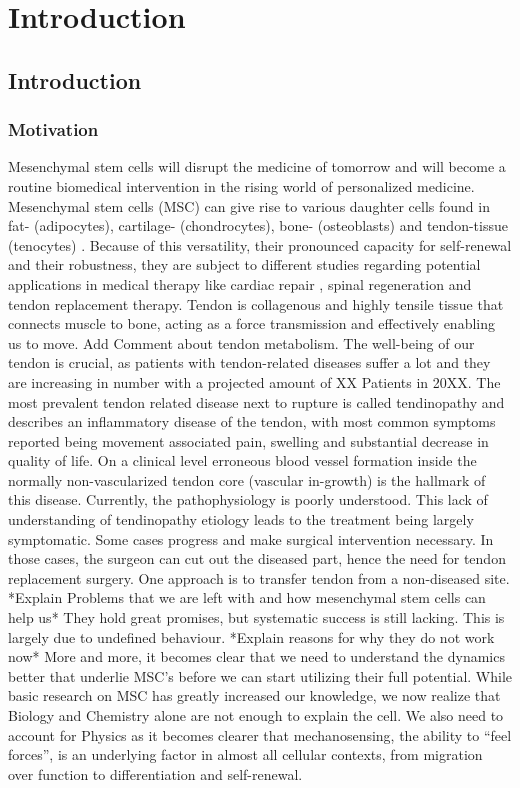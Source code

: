 \chapter{Introduction}

\section{Introduction}
\subsection{Motivation}
\label{sec:motivation}
Mesenchymal stem cells will disrupt the medicine of tomorrow and will become a routine biomedical intervention in the rising world of personalized medicine. 
Mesenchymal stem cells (MSC) can give rise to various daughter cells found in fat- (adipocytes), cartilage- (chondrocytes), bone- (osteoblasts) and tendon-tissue (tenocytes) \cite{Barlow2008, Hass2011}. Because of this versatility, their pronounced capacity for self-renewal and their robustness, they are subject to different studies regarding potential applications in medical therapy like cardiac repair \cite{Pittenger2004}, spinal regeneration \cite{Goldschlager2010} and tendon replacement therapy.  
Tendon is collagenous and highly tensile tissue that connects muscle to bone, acting as a force transmission and effectively enabling us to move. Add Comment about tendon metabolism. The well-being of our tendon is crucial, as patients with tendon-related diseases suffer a lot and they are increasing in number with a projected amount of XX Patients in 20XX. The most prevalent tendon related disease next to rupture is called tendinopathy and describes an inflammatory disease of the tendon, with most common symptoms reported being movement associated pain, swelling and substantial decrease in quality of life. On a clinical level erroneous blood vessel formation inside the normally non-vascularized tendon core (vascular in-growth) is the hallmark of this disease. Currently, the pathophysiology is poorly understood. This lack of understanding of tendinopathy etiology leads to the treatment being largely symptomatic.  Some cases progress and make surgical intervention necessary. In those cases, the surgeon can cut out the diseased part, hence the need for tendon replacement surgery.  One approach is to transfer tendon from a non-diseased site. *Explain Problems that we are left with and how mesenchymal stem cells can help us* They hold great promises, but systematic success is still lacking. This is largely due to undefined behaviour. *Explain reasons for why they do not work now* More and more, it becomes clear that we need to understand the dynamics better that underlie MSC’s before we can start utilizing their full potential. While basic research on MSC has greatly increased our knowledge, we now realize that Biology and Chemistry alone are not enough to explain the cell. We also need to account for Physics as it becomes clearer that mechanosensing, the ability to “feel forces”, is an underlying factor in almost all cellular contexts, from migration over function to differentiation and self-renewal.  
